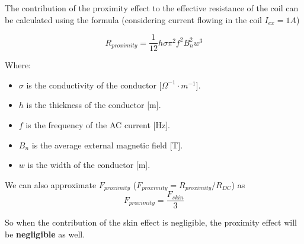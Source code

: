 \begin{itemize}
    \begin{samepage}
        The contribution of the proximity effect to the effective resistance of the coil can be calculated using the formula (considering current flowing in the coil $I_{ex} = 1A$) \cite{AC_res_Optimization}
        \nopagebreak

        \begin{equation*}
            R_{proximity} = \frac{1}{12} h \sigma \pi^2 f^2 B_n^2 w^3
        \end{equation*}
        \nopagebreak
        
        Where:
        \begin{itemize}
            \item \( \sigma \) is the conductivity of the conductor [\(\Omega^{-1} \cdot m^{-1}\)].
            \item \( h \) is the thickness of the conductor [m].
            \item \( f \) is the frequency of the AC current [Hz].
            \item \( B_n \) is the average external magnetic field [T].
            \item \( w \) is the width of the conductor [m].
        \end{itemize}
    \end{samepage}

    We can also approximate $F_{proximity}$ ($F_{proximity} = R_{proximity}/R_{DC}$) as
    \begin{equation*}
        F_{proximity} = \frac{F_{skin}}{3}
    \end{equation*}

    So when the contribution of the skin effect is negligible, the proximity effect will be \textbf{negligible} as well.

\end{itemize}





